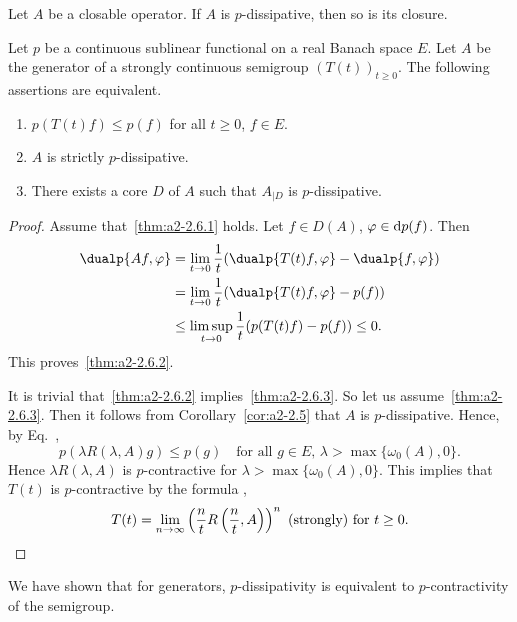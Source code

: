 \begin{corollary}\label{cor:a2-2.5}
Let $A$ be a closable operator.
If\/ $A$ is $p$-dissipative, then so is its closure.
\end{corollary}
\begin{theorem}\label{thm:a2-2.6}
Let $p$ be a continuous sublinear functional on a real Banach space $E$.
Let $A$ be the generator of a strongly continuous semigroup $(T(t))_{t\geq 0}$.
The following assertions are equivalent.
\begin{enumerate}[\upshape (a)]
\item \label{thm:a2-2.6.1}
$p(T(t)f) \leq p(f)$ for all $t \geq 0$, $f \in E$.

\item \label{thm:a2-2.6.2}
$A$ is strictly $p$-dissipative.
 
\item \label{thm:a2-2.6.3}
There exists a core $D$ of\/ $A$ such that $A_{\vert D}$ is $p$-dissipative.
\end{enumerate}
\end{theorem}
\begin{proof}
Assume that~\ref{thm:a2-2.6.1} holds.
Let $f \in D(A)$, $\phi \in \ddp(f)$.
Then 
\begin{align*}
	\dualp{Af,\phi} &= \lim_{t\to 0} \frac{1}{t} (\dualp{T(t)f,\phi} - \dualp{f,\phi}) \\
	&= \lim_{t\to 0} \frac{1}{t} (\dualp{T(t)f,\phi} - p(f)) \\
	&\leq \limsup_{t\to 0} \frac{1}{t} (p(T(t)f) - p(f)) \leq 0. 
\end{align*}
This proves~\ref{thm:a2-2.6.2}. 

It is trivial that~\ref{thm:a2-2.6.2} implies~\ref{thm:a2-2.6.3}.  
So let us assume~\ref{thm:a2-2.6.3}. 
Then it follows from Corollary~\ref{cor:a2-2.5}   that $A$ is $p$-dissipative.
Hence, by Eq.~,  
%
\[
	p(\lambda R(\lambda,A)g) \leq p(g) \quad\text{for all $g \in E$, $\lambda > \max\{\omega_{0}(A),0\}$}.
\]
%
Hence $\lambda R(\lambda,A)$ is $p$-contractive for $\lambda > \max\{\omega_{0}(A),0\}$.
This implies that $T(t)$ is $p$-contractive by the formula , 
\begin{equation*}
T(t) = \lim_{n\to\infty} \left( \frac{n}{t} R\left( \frac{n}{t},A \right) \right)^{n} 
	\text{ (strongly) for } t \geq 0. 
	\qedhere
\end{equation*}
\end{proof}
We have shown that for generators, $p$-dissipativity is equivalent to $p$-contractivity of the semigroup.
